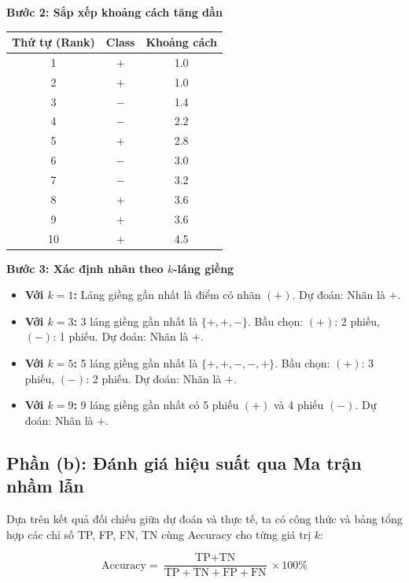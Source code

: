 \textbf{Bước 2: Sắp xếp khoảng cách tăng dần}
\begin{table}[H]
    \centering
    \begin{tabular}{|c|c|c|}
        \hline
        \textbf{Thứ tự (Rank)} & \textbf{Class} & \textbf{Khoảng cách} \\
        \hline
        1 & $+$ & 1.0 \\ \hline
        2 & $+$ & 1.0 \\ \hline
        3 & $-$ & 1.4 \\ \hline
        4 & $-$ & 2.2 \\ \hline
        5 & $+$ & 2.8 \\ \hline
        6 & $-$ & 3.0 \\ \hline
        7 & $-$ & 3.2 \\ \hline
        8 & $+$ & 3.6 \\ \hline
        9 & $+$ & 3.6 \\ \hline
        10 & $+$ & 4.5 \\ \hline
    \end{tabular}
\end{table}

\textbf{Bước 3: Xác định nhãn theo $k$-láng giềng}
\begin{itemize}
    \item \textbf{Với $k = 1$:} Láng giềng gần nhất là điểm có nhãn $(+)$. Dự đoán: Nhãn là \textbf{$+$}.
    \item \textbf{Với $k = 3$:} 3 láng giềng gần nhất là $\{+, +, -\}$. Bầu chọn: $(+)$: 2 phiếu, $(-)$: 1 phiếu. Dự đoán: Nhãn là \textbf{$+$}.
    \item \textbf{Với $k = 5$:} 5 láng giềng gần nhất là $\{+, +, -, -, +\}$. Bầu chọn: $(+)$: 3 phiếu, $(-)$: 2 phiếu. Dự đoán: Nhãn là \textbf{$+$}.
    \item \textbf{Với $k = 9$:} 9 láng giềng gần nhất có 5 phiếu $(+)$ và 4 phiếu $(-)$. Dự đoán: Nhãn là \textbf{$+$}.
\end{itemize}

\subsection{Phần (b): Đánh giá hiệu suất qua Ma trận nhầm lẫn}
Dựa trên kết quả đối chiếu giữa dự đoán và thực tế, ta có công thức và bảng tổng hợp các chỉ số TP, FP, FN, TN cùng Accuracy cho từng giá trị $k$:

$$\text{Accuracy} = \frac{\text{TP} + \text{TN}}{\text{TP} + \text{TN} + \text{FP} + \text{FN}} \times 100\%$$

